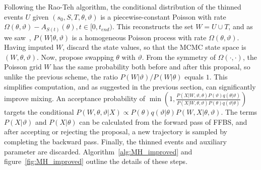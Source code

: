 Following the Rao-Teh algorithm, the conditional distribution of the thinned events $U$ given $(s_0,S,T,\theta,\vartheta)$ is a piecewise-constant Poisson with rate $\Omega(\theta, \vartheta) - A_{S(t)}(\theta), t \in [0,t_{end})$. 
This reconstructs the set $W = U \cup T$,  and as we saw~\citep[see also][]{RaoTeh13}, $P(W|\theta,\vartheta)$ is a homogeneous Poisson process with rate $\Omega(\theta, \vartheta)$. 
Having imputed $W$, discard the state values, so that the MCMC state space is $(W, \theta, \vartheta)$.
Now, propose swapping $\theta$ with $\vartheta$. 
From the symmetry of $\Omega(\cdot,\cdot)$, the Poisson grid $W$ has the same probability both
before and after this proposal, so unlike the previous scheme, the ratio $P(W|\vartheta)/P(W|\theta)$ equals $1$.  
This simplifies computation, and as suggested in the previous section, can significantly improve mixing.
An acceptance probability of
$ 
  \min\left(1, \frac{P(X|W,\vartheta,\theta) P(\vartheta) q(\theta|\vartheta)}
   {P(X|W,\theta,\vartheta) P(\theta)q(\vartheta|\theta)}\right)
   $ 
   targets the conditional $P(W,\theta,\vartheta|X) \propto P(\theta)q(\vartheta|\theta)P(W,X|\theta,\vartheta)$.
   The terms $P(X|\vartheta)$ and  $P(X|\theta)$ can be calculated from the forward pass of FFBS, and after
   accepting or rejecting the proposal, a new trajectory is sampled by
   completing the backward pass. Finally, the thinned events and auxiliary parameter are
   discarded. Algorithm~\ref{alg:MH_improved} and 
   figure~\ref{fig:MH_improved} outline the details of these steps. 
